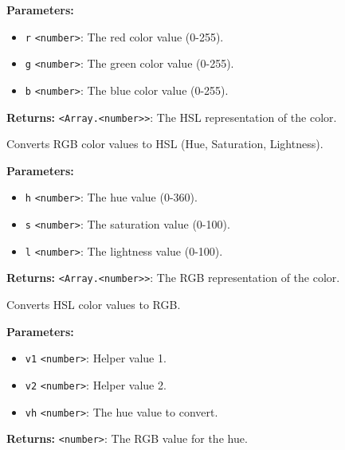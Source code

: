 \documentclass[12pt,a4paper]{article}
\begin{document}
\noindent \textbf{Parameters:}
\begin{itemize}
  \item \texttt{r} \texttt{<number>}: The red color value (0-255).
  \item \texttt{g} \texttt{<number>}: The green color value (0-255).
  \item \texttt{b} \texttt{<number>}: The blue color value (0-255).
\end{itemize}

\noindent \textbf{Returns:} \texttt{<Array.<number>>}: The HSL representation of the color.

\noindent Converts RGB color values to HSL (Hue, Saturation, Lightness).

\vspace{5mm}
\noindent {}


\noindent \textbf{Parameters:}
\begin{itemize}
  \item \texttt{h} \texttt{<number>}: The hue value (0-360).
  \item \texttt{s} \texttt{<number>}: The saturation value (0-100).
  \item \texttt{l} \texttt{<number>}: The lightness value (0-100).
\end{itemize}

\noindent \textbf{Returns:} \texttt{<Array.<number>>}: The RGB representation of the color.

\noindent Converts HSL color values to RGB.

\vspace{5mm}
\noindent {}


\noindent \textbf{Parameters:}
\begin{itemize}
  \item \texttt{v1} \texttt{<number>}: Helper value 1.
  \item \texttt{v2} \texttt{<number>}: Helper value 2.
  \item \texttt{vh} \texttt{<number>}: The hue value to convert.
\end{itemize}

\noindent \textbf{Returns:} \texttt{<number>}: The RGB value for the hue.
\end{document}
